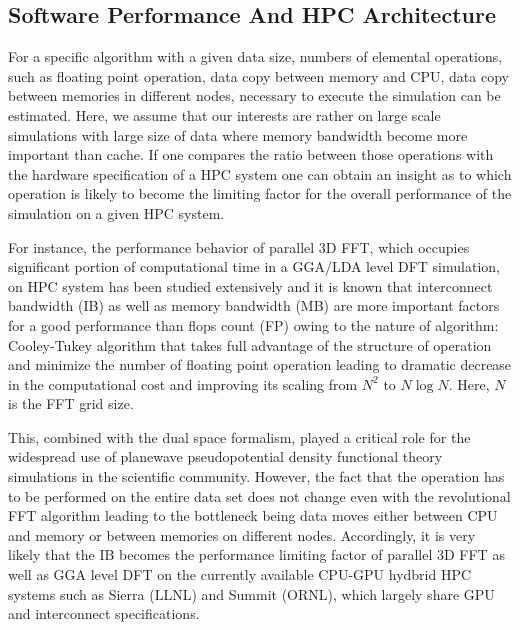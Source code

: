 
\subsection{Software Performance And HPC Architecture}
\label{subsec:hpc}

For a specific algorithm with a given data size, numbers of elemental operations, such as floating point operation, data copy between memory and CPU, data copy between memories in different nodes, necessary to execute the simulation can be estimated. Here, we assume that our interests are rather on large  scale simulations with large size of data where memory bandwidth become more important than cache. If one compares the ratio between those operations with the hardware specification of a HPC system one can obtain an insight as to which operation is likely to become the limiting factor for the overall performance of the simulation on a given HPC system. 

For instance, the performance behavior of parallel 3D FFT, which occupies significant portion of computational time in a GGA/LDA level DFT simulation, on HPC system has been studied extensively and it is known that interconnect bandwidth (IB) as well as memory bandwidth (MB) are more important factors for a good performance than flops count (FP) owing to the nature of algorithm: Cooley-Tukey algorithm that takes full advantage of the structure of operation and minimize the number of floating point operation leading to dramatic decrease in the computational cost and improving its scaling from $N^2$ to $N\log{N}$.\cite{cooley1965} Here, $N$ is the FFT grid size.

This, combined with the dual space formalism,\cite{Martin1988} played a critical role for the widespread use of planewave pseudopotential density functional theory simulations in the scientific community. However, the fact that the operation has to be performed on the entire data set does not change even with the revolutional FFT algorithm leading to the bottleneck being data moves either between CPU and memory or between memories on different nodes. Accordingly, it is very likely that the IB becomes the performance limiting factor of parallel 3D FFT as well as GGA level DFT on the currently available CPU-GPU hydbrid HPC systems such as Sierra (LLNL) and Summit (ORNL), which largely share GPU and interconnect specifications. 

